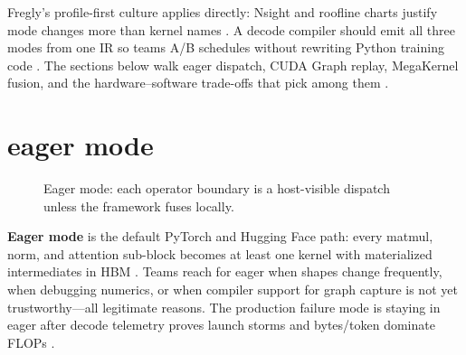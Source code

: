 Fregly's profile-first culture applies directly: Nsight and roofline charts justify mode changes more than kernel names \citep{patel2025llminference,semianalysis2024tma,memoryfloor2026,taxbreak2026}. A decode compiler should emit all three modes from one IR so teams A/B schedules without rewriting Python training code \citep{yirage2026,chen2020compilerbasedhardw,amd2024xdna,amd2024aie,kwon2023vllm,liu2024deepseekv3,dlbook,dao2022flashattention,dao2023flashdecoding,nvidia2024cudagraphs,nvidia2022hopper}. The sections below walk eager dispatch, CUDA Graph replay, MegaKernel fusion, and the hardware--software trade-offs that pick among them \citep{taxbreak2026,memoryfloor2026,patel2025llminference,yirage2026,chen2020compilerbasedhardw,amd2024xdna,semianalysis2024tma,dao2022flashattention,kwon2023vllm,liu2024deepseekv3,dlbook,dao2023flashdecoding,nvidia2024cudagraphs,nvidia2022hopper,amd2024aie}.

\section{eager mode}
\label{sec:ch12_eager_mode}


\begin{figure}[t]
\centering
{}
\caption{Eager mode: each operator boundary is a host-visible dispatch unless the framework fuses locally.}
\label{fig:eager_mode_pipeline}
\end{figure}

\textbf{Eager mode} is the default PyTorch and Hugging Face path: every matmul, norm, and attention sub-block becomes at least one kernel with materialized intermediates in HBM \citep{kwon2023vllm,patel2025llminference}. Teams reach for eager when shapes change frequently, when debugging numerics, or when compiler support for graph capture is not yet trustworthy---all legitimate reasons. The production failure mode is staying in eager after decode telemetry proves launch storms and bytes/token dominate FLOPs \citep{taxbreak2026,memoryfloor2026}.


